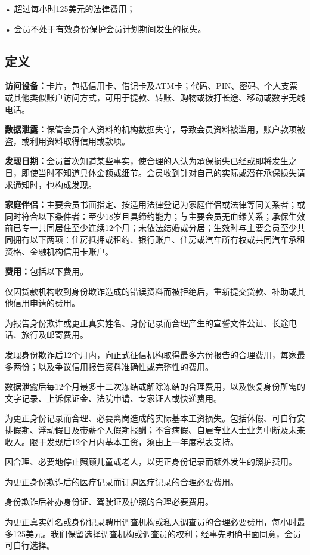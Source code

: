 \documentclass[UTF8,fontset=none,11pt,a4paper]{ctexart}
\begin{document}
• 超过每小时125美元的法律费用；


• 会员不处于有效身份保护会员计划期间发生的损失。


\subsection*{定义}
\textbf{访问设备：}卡片，包括信用卡、借记卡及ATM卡；代码、PIN、密码、个人支票或其他类似账户访问方式，可用于提款、转账、购物或拨打长途、移动或数字无线电话。


\textbf{数据泄露：}保管会员个人资料的机构数据失守，导致会员资料被滥用，账户款项被盗，或利用资料取得信用或款项。


\textbf{发现日期：}会员首次知道某些事实，使合理的人认为承保损失已经或即将发生之日，即使当时不知道具体金额或细节。会员收到针对自己的实际或潜在承保损失请求通知时，也构成发现。


\textbf{家庭伴侣：}主要会员书面指定、按适用法律登记为家庭伴侣或法律等同关系者；或同时符合以下条件者：至少18岁且具缔约能力；与主要会员无血缘关系；承保生效前已专一共同居住至少连续12个月；未依法结婚或分居；生效时与主要会员至少共同拥有以下两项：住房抵押或租约、银行账户、住房或汽车所有权或共同汽车承租资格、金融机构信用卡账户。


\textbf{费用：}包括以下费用。


仅因贷款机构收到身份欺诈造成的错误资料而被拒绝后，重新提交贷款、补助或其他信用申请的费用。


为报告身份欺诈或更正真实姓名、身份记录而合理产生的宣誓文件公证、长途电话、旅行及邮寄费用。


发现身份欺诈后12个月内，向正式征信机构取得最多六份报告的合理费用，每家最多两份；以及争议信用报告资料准确性或完整性的费用。


数据泄露后每12个月最多十二次冻结或解除冻结的合理费用，以及恢复身份所需的文字记录、上诉保证金、法院申请、专家证人或快递费用。


为更正身份记录而合理、必要离岗造成的实际基本工资损失。包括休假、可自行安排假期、浮动假日及带薪个人假期报酬；不含病假、自雇专业人士业务中断及未来收入。限于发现后12个月内基本工资，须由上一年度税表支持。


因合理、必要地停止照顾儿童或老人，以更正身份记录而额外发生的照护费用。


为更正身份欺诈后的医疗记录而订购医疗记录的合理必要费用。


身份欺诈后补办身份证、驾驶证及护照的合理必要费用。


为更正真实姓名或身份记录聘用调查机构或私人调查员的合理必要费用，每小时最多125美元。我们保留选择调查机构或调查员的权利；经事先明确书面同意，会员可自行选择。
\end{document}
